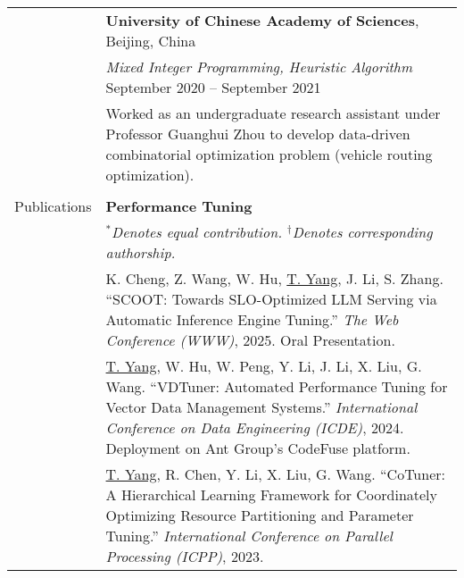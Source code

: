 \documentclass[letterpaper, 10pt]{article}
\begin{document}
\begin{longtable}{p{}p{}}
& \textbf{University of Chinese Academy of Sciences}, Beijing, China \\ 
& \textit{Mixed Integer Programming, Heuristic Algorithm} \hfill September 2020 -- September 2021 \\
&  Worked as an undergraduate research assistant under Professor Guanghui Zhou to develop data-driven combinatorial optimization problem (vehicle routing optimization). \\
& \\




\nohyphens{\textcolor{OliveGreen}{Publications}} 
& \textbf{Performance Tuning} 
\vspace{0.01\textwidth} \\

& \textit{$^*$Denotes equal contribution. $^\dagger$Denotes corresponding authorship.} 
\vspace{0.01\textwidth} \\

& K. Cheng, Z. Wang, W. Hu, \underline{T. Yang}, J. Li, S. Zhang. \enquote{SCOOT: Towards SLO-Optimized LLM Serving via Automatic Inference Engine Tuning.} \textit{The Web Conference (WWW)}, 2025. \textcolor[RGB]{200, 0, 0}{Oral Presentation.}
\vspace{0.01\textwidth} \\

& \underline{T. Yang}, W. Hu, W. Peng, Y. Li, J. Li, X. Liu, G. Wang. \enquote{VDTuner: Automated Performance Tuning for Vector Data Management Systems.} \textit{International Conference on Data Engineering (ICDE)}, 2024. \textcolor[RGB]{200, 0, 0}{Deployment on Ant Group's CodeFuse platform.}
\vspace{0.01\textwidth} \\

& \underline{T. Yang}, R. Chen, Y. Li, X. Liu, G. Wang. \enquote{CoTuner: A Hierarchical Learning Framework for Coordinately Optimizing Resource Partitioning and Parameter Tuning.} \textit{International Conference on Parallel Processing (ICPP)}, 2023.
\vspace{0.01\textwidth} \\


\end{longtable}
\end{document}
